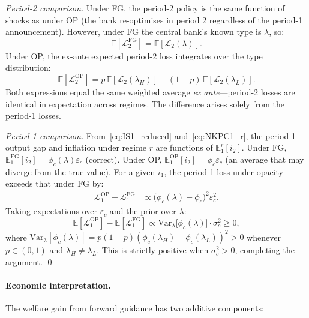 \noindent\textit{Period-2 comparison.}
Under FG, the period-2 policy is the same function of shocks as under OP (the bank
re-optimises in period 2 regardless of the period-1 announcement). However, under FG
the central bank's known type is $\lambda$, so:
\begin{equation}
  \mathbb{E}[\mathcal{L}_2^{\mathrm{FG}}] = \mathbb{E}[\mathcal{L}_2(\lambda)].
\end{equation}
Under OP, the ex-ante expected period-2 loss integrates over the type distribution:
\begin{equation}
  \mathbb{E}[\mathcal{L}_2^{\mathrm{OP}}]
    = p\,\mathbb{E}[\mathcal{L}_2(\lambda_H)]
    + (1-p)\,\mathbb{E}[\mathcal{L}_2(\lambda_L)].
\end{equation}
Both expressions equal the same weighted average \emph{ex ante}---period-2 losses are
identical in expectation across regimes. The difference arises solely from the
period-1 losses.

\noindent\textit{Period-1 comparison.}
From~\eqref{eq:IS1_reduced} and~\eqref{eq:NKPC1_r}, the period-1 output gap and
inflation under regime $r$ are functions of $\mathbb{E}_1^r[i_2]$. Under FG,
$\mathbb{E}_1^{\mathrm{FG}}[i_2] = \phi_c(\lambda)\varepsilon_c$ (correct). Under OP,
$\mathbb{E}_1^{\mathrm{OP}}[i_2] = \bar{\phi}_c\varepsilon_c$ (an average that may
diverge from the true value). For a given $i_1$, the period-1 loss under opacity
exceeds that under FG by:
\begin{align}
  \mathcal{L}_1^{\mathrm{OP}} - \mathcal{L}_1^{\mathrm{FG}}
  &\propto \bigl(\phi_c(\lambda) - \bar{\phi}_c\bigr)^2 \varepsilon_c^2.
  \label{eq:L1_gap}
\end{align}
Taking expectations over $\varepsilon_c$ and the prior over $\lambda$:
\begin{equation}
  \mathbb{E}[\mathcal{L}_1^{\mathrm{OP}}] - \mathbb{E}[\mathcal{L}_1^{\mathrm{FG}}]
  \propto \mathrm{Var}_\lambda\bigl[\phi_c(\lambda)\bigr]\cdot\sigma_c^2 \geq 0,
  \label{eq:L1_gap_expected}
\end{equation}
where $\mathrm{Var}_\lambda[\phi_c(\lambda)] = p(1-p)(\phi_c(\lambda_H) -
\phi_c(\lambda_L))^2 > 0$ whenever $p \in (0,1)$ and $\lambda_H \neq \lambda_L$.
This is strictly positive when $\sigma_c^2 > 0$, completing the argument. \qed

\paragraph{Economic interpretation.}
The welfare gain from forward guidance has two additive components:

